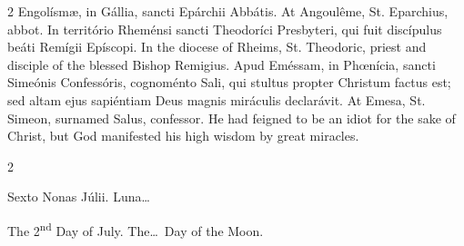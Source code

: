 \begin{paracol}{2}
\switchcolumn*
{}
Engolísmæ, in Gállia, 
 sancti Epárchii Abbátis.
\switchcolumn
{}
At Angoulême, St. Eparchius, abbot.
\switchcolumn*
{}
In território Rheménsi 
 sancti Theodoríci Presbyteri, qui fuit discípulus beáti Remígii Epíscopi.
\switchcolumn
{}
In the diocese of Rheims, St. 
 Theodoric, priest and disciple of the blessed Bishop Remigius.
\switchcolumn*
{}
Apud Eméssam, in 
 Phœnícia, sancti Simeónis Confessóris, cognoménto Sali, qui stultus propter 
 Christum factus est; sed altam ejus sapiéntiam Deus magnis miráculis 
 declarávit.
\switchcolumn
{}
At Emesa, St. Simeon, surnamed Salus, 
 confessor. He had feigned to be an idiot for the sake of Christ, but 
 God manifested his high wisdom by great miracles.
\switchcolumn*
{}
\end{paracol}


\begin{paracol}{2}
\begin{center}{\color{gregoriocolor} Sexto Nonas Júlii. 
 Luna\dots\ }\end{center}
\switchcolumn
{}
\begin{center}{\color{gregoriocolor} The 2\textsuperscript{nd} Day of July. The\dots\ Day of the 
 Moon.}\end{center}
\end{paracol}

